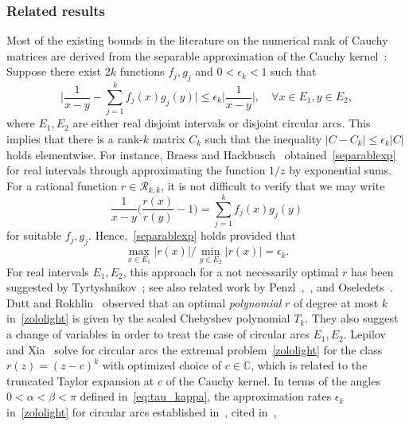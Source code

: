 \documentclass[final,reqno,onefignum,onetabnum]{siamart190516}
\begin{document}
 
\subsubsection{Related results}

Most of the existing bounds in the literature on the numerical rank of Cauchy matrices are derived from the separable approximation of the Cauchy kernel~\cite{chandrasekaran2007superfast,Penzl2000,Tyrtyshnikov1996}: Suppose there exist $2k$ functions $f_j,g_j$ and $0 < \epsilon_k < 1$ such that
\begin{equation} \label{separablexp}
  \Big| \frac{1}{x-y} - \sum_{j = 1}^k f_j(x) g_j(y)  \Big| \le \epsilon_k \Big| \frac{1}{x-y} \Big|, \quad \forall x \in E_1, y \in E_2,
\end{equation}
where $E_1, E_2$ are either real disjoint intervals or disjoint circular arcs. This implies that there is a rank-$k$ matrix $C_k$ such that 
the inequality $|C-C_k| \le \epsilon_k |C|$ holds elementwise. For instance, Braess and Hackbusch~\cite{braess2009efficient} obtained~\eqref{separablexp} for real intervals through approximating the function $1/z$ by exponential sums. For a rational function $r\in \mathcal{R}_{k,k}$, it is not difficult
to verify that we may write
\[
 \frac{1}{x-y} \Big( \frac{r(x)}{r(y)}-1 \Big) = \sum_{j = 1}^k f_j(x) g_j(y)
\]
for suitable $f_j,g_j$. Hence,~\eqref{separablexp} holds provided that
\begin{equation} \label{zololight}
 \max_{x \in E_1} |r(x)| \big/ \min_{y \in E_2} |r(x)| = \epsilon_k.
\end{equation}
For real intervals $E_1,E_2$, this approach for a not necessarily optimal $r$ has been suggested by Tyrtyshnikov~\cite{Tyrtyshnikov1996}; see also related work by Penzl~\cite{Penzl2000},~\cite{Grasedyck2004}, and Oseledets~\cite{Oseledets2007}.
Dutt and Rokhlin~\cite[Sec. 2.2]{dutt1995fast} observed that an optimal \emph{polynomial} $r$ of degree at most $k$ in~\eqref{zololight} is given by the scaled Chebyshev polynomial $T_k$. They also suggest a change of variables in order to treat the case of circular arcs $E_1,E_2$. Lepilov and Xia~\cite[Theorem 1]{Lepilov2024} solve for circular arcs the extremal problem~\eqref{zololight} for the class $r(z) = (z-c)^k$ with optimized choice of $c \in \mathbb C$, which is related to the truncated Taylor expansion at $c$ of the Cauchy kernel. In terms of the angles $0 < \alpha < \beta < \pi$ defined in~\eqref{eq:tau_kappa}, the approximation rates $\epsilon_k$ in~\eqref{zololight} for circular arcs established in~\cite{dutt1995fast}, cited in~\cite{martinsson2005fast},
\end{document}
